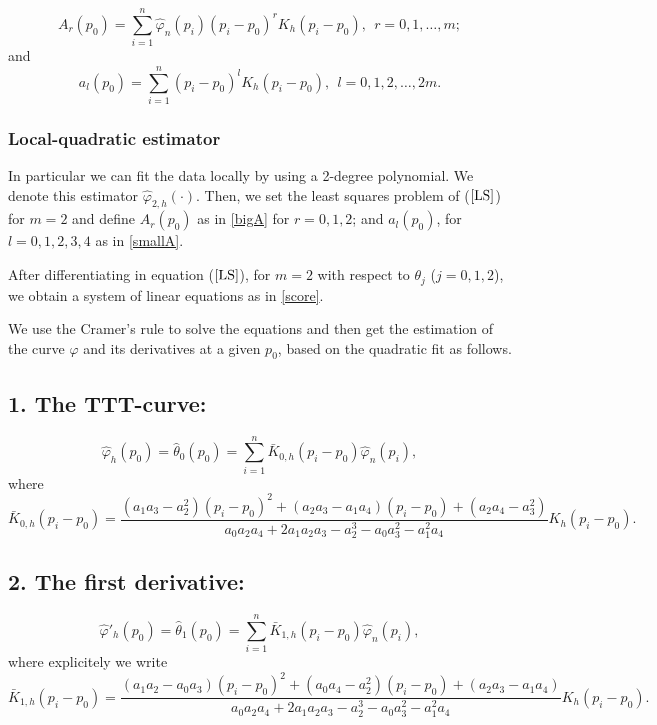 \documentclass[preprint,12pt]{elsarticle}
\begin{document}
\begin{equation}\label{bigA}
A_r(p_0)=\sum_{i=1}^n\widehat{\varphi}_n(p_i)(p_i-p_0)^r K_h(p_i-p_0), \ \ r=0,1,\ldots,m;
\end{equation}
and 
\begin{equation}\label{smallA}
a_l(p_0)=\sum_{i=1}^n(p_i-p_0)^l K_h(p_i-p_0), \ \ l=0,1,2,\ldots,2m.
\end{equation}

\subsubsection{Local-quadratic estimator}\label{quad}

In particular we can fit the data locally by using a 2-degree polynomial. We denote this estimator $\widehat{\varphi}_{2,h}(\cdot)$. Then, we set the least squares problem of ($\ref{LS}$) for $m=2$ and define $A_r(p_0)$ as in \eqref{bigA} for $ r=0,1,2$; and  $
a_l(p_0)$, for $ l=0, 1, 2, 3, 4$ as in \eqref{smallA}.

After differentiating in equation ($\ref{LS}$), for $m=2$ with respect to $\theta_j$ ($j=0, 1, 2$), we obtain a system of linear equations as in \eqref{score}.


We use the Cramer's rule to solve the equations and then get the estimation of the curve $\varphi$ and its derivatives at a given $p_0$, based on the quadratic fit as follows.
\subsection*{ 1. The TTT-curve:}
\begin{equation}\label{theta0}
\widehat{\varphi}_{h}(p_0)=\widehat{\theta}_0(p_0)= \sum_{i=1}^n \bar{{K}}_{0,h}\left(p_i-p_0\right) \widehat{\varphi}_n(p_i),
\end{equation}
where
\[
\bar{{K}}_{0,h}\left(p_i-p_0\right)=\frac{\left(a_1a_3-a_2^2\right)\left(p_i-p_0\right)^2+\left(a_2a_3-a_1a_4\right)\left(p_i-p_0\right)+\left(a_2a_4-a_3^2\right)}{a_0a_2a_4+2a_1a_2a_3-a_2^3-a_0a_3^2-a_1^2a_4} K_h\left(p_i-p_0\right).
\]

\subsection*{2. The first derivative:}
\begin{equation}\label{theta1}
\widehat{\varphi}'_{h}(p_0)=\widehat{\theta}_1(p_0)= \sum_{i=1}^n \bar{{K}}_{1,h}\left(p_i-p_0\right) \widehat{\varphi}_n(p_i),
\end{equation}
where explicitely we write
\[
\bar{{K}}_{1,h}\left(p_i-p_0\right)=\frac{\left(a_1a_2-a_0a_3\right)\left(p_i-p_0\right)^2+\left(a_0a_4-a_2^2\right)\left(p_i-p_0\right)+\left(a_2a_3-a_1a_4\right)}{a_0a_2a_4+2a_1a_2a_3-a_2^3-a_0a_3^2-a_1^2a_4} K_h\left(p_i-p_0\right).
\]
\end{document}
